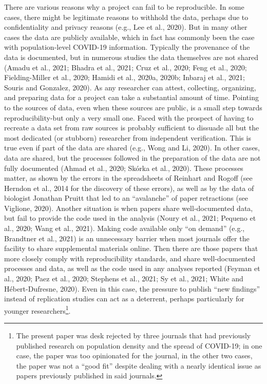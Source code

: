 \documentclass[]{elsarticle} %
\begin{document}
There are various reasons why a project can fail to be reproducible. In
some cases, there might be legitimate reasons to withhold the data,
perhaps due to confidentiality and privacy reasons (e.g., Lee et al.,
2020). But in many other cases the data are publicly available, which in
fact has commonly been the case with population-level COVID-19
information. Typically the provenance of the data is documented, but in
numerous studies the data themselves are not shared (Amadu et al., 2021;
Bhadra et al., 2021; Cruz et al., 2020; Feng et al., 2020;
Fielding-Miller et al., 2020; Hamidi et al., 2020a, 2020b; Inbaraj et
al., 2021; Souris and Gonzalez, 2020). As any researcher can attest,
collecting, organizing, and preparing data for a project can take a
substantial amount of time. Pointing to the sources of data, even when
these sources are public, is a small step towards reproducibility-but
only a very small one. Faced with the prospect of having to recreate a
data set from raw sources is probably sufficient to dissuade all but the
most dedicated (or stubborn) researcher from independent verification.
This is true even if part of the data are shared (e.g., Wong and Li,
2020). In other cases, data are shared, but the processes followed in
the preparation of the data are not fully documented (Ahmad et al.,
2020; Skórka et al., 2020). These processes matter, as shown by the
errors in the spreadsheets of Reinhart and Rogoff (see Herndon et al.,
2014 for the discovery of these errors), as well as by the data of
biologist Jonathan Pruitt that led to an ``avalanche'' of paper
retractions (see Viglione, 2020). Another situation is when papers share
well-documented data, but fail to provide the code used in the analysis
(Noury et al., 2021; Pequeno et al., 2020; Wang et al., 2021). Making
code available only ``on demand'' (e.g., Brandtner et al., 2021) is an
unnecessary barrier when most journals offer the facility to share
supplemental materials online. Then there are those papers that more
closely comply with reproducibility standards, and share well-documented
processes and data, as well as the code used in any analyses reported
(Feyman et al., 2020; Paez et al., 2020; Stephens et al., 2021; Sy et
al., 2021; White and Hébert-Dufresne, 2020). Even in this case, the
pressure to publish ``new findings'' instead of replication studies can
act as a deterrent, perhaps particularly for younger
researchers\footnote{The present paper was desk rejected by three
  journals that had previously published research on population density
  and the spread of COVID-19; in one case, the paper was too opinionated
  for the journal, in the other two cases, the paper was not a ``good
  fit'' despite dealing with a nearly identical issue as papers
  previously published in said journals.}.
\end{document}
